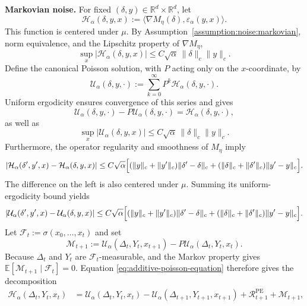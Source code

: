 \documentclass[11pt,letterpaper]{article}
\theoremstyle{plain}
\theoremstyle{definition}
\theoremstyle{remark}
\newcommand{\E}{\mathbb{E}}
\newcommand{\R}{\mathbb{R}}
\begin{document}
\noindent\textbf{Markovian noise.}
For fixed $(\delta,y)\in\R^d\times\R^d$, let
\[
    \mathcal H_\alpha(\delta,y,x)
    :=\langle\nabla M_\eta(\delta),\varepsilon_\alpha(y,x)\rangle.
\]
This function is centered under $\mu$. By
Assumption~\ref{assumption:noise:markovian}, norm equivalence, and the
Lipschitz property of $\nabla M_\eta$,
\[
    \sup_x|\mathcal H_\alpha(\delta,y,x)|
    \leq C\sqrt\alpha\,\|\delta\|_c\|y\|_c.
\]
Define the canonical Poisson solution, with $P$ acting only on the
$x$-coordinate, by
\[
    \mathcal U_\alpha(\delta,y,\cdot)
    :=\sum_{k=0}^{\infty}P^k\mathcal H_\alpha(\delta,y,\cdot).
\]
Uniform ergodicity ensures convergence of this series and gives
\begin{equation}
\label{eq:additive-poisson-equation}
    \mathcal U_\alpha(\delta,y,\cdot)
      -P\mathcal U_\alpha(\delta,y,\cdot)
    =\mathcal H_\alpha(\delta,y,\cdot),
\end{equation}
as well as
\begin{equation}
\label{eq:additive-poisson-size}
    \sup_x|\mathcal U_\alpha(\delta,y,x)|
    \leq C\sqrt\alpha\,\|\delta\|_c\|y\|_c.
\end{equation}
Furthermore, the operator regularity and smoothness of $M_\eta$ imply
\begin{align*}
    |\mathcal H_\alpha(\delta',y',x)
        -\mathcal H_\alpha(\delta,y,x)|\leq C\sqrt\alpha\Bigl[
        (\|y\|_c+\|y'\|_c)\|\delta'-\delta\|_c
        +(\|\delta\|_c+\|\delta'\|_c)\|y'-y\|_c\Bigr].
\end{align*}
The difference on the left is also centered under $\mu$. Summing its
uniform-ergodicity bound yields
\begin{equation}
\label{eq:additive-poisson-regularity}
\begin{aligned}
    |\mathcal U_\alpha(\delta',y',x)
        -\mathcal U_\alpha(\delta,y,x)|\leq C\sqrt\alpha\Bigl[
        (\|y\|_c+\|y'\|_c)\|\delta'-\delta\|_c
        +(\|\delta\|_c+\|\delta'\|_c)\|y'-y\|_c\Bigr].
\end{aligned}
\end{equation}
Let $\mathcal F_t:=\sigma(x_0,\ldots,x_t)$ and set
\[
    \mathcal M_{t+1}
    :=\mathcal U_\alpha(\Delta_t,Y_t,x_{t+1})
       -P\mathcal U_\alpha(\Delta_t,Y_t,x_t).
\]
Because  $\Delta_t$ and $Y_t$ are $\mathcal F_t$-measurable, and the
Markov property gives
$\E[\mathcal M_{t+1}\mid\mathcal F_t]=0$. Equation
\eqref{eq:additive-poisson-equation} therefore gives the decomposition
\begin{equation}
\label{eq:additive-poisson-decomposition}
\begin{aligned}
    \mathcal H_\alpha(\Delta_t,Y_t,x_t)
    &=\mathcal U_\alpha(\Delta_t,Y_t,x_t)
      -\mathcal U_\alpha(\Delta_{t+1},Y_{t+1},x_{t+1})
      +\mathcal R_{t+1}^{\mathrm{PE}}+\mathcal M_{t+1},
\end{aligned}
\end{equation}
\end{document}
